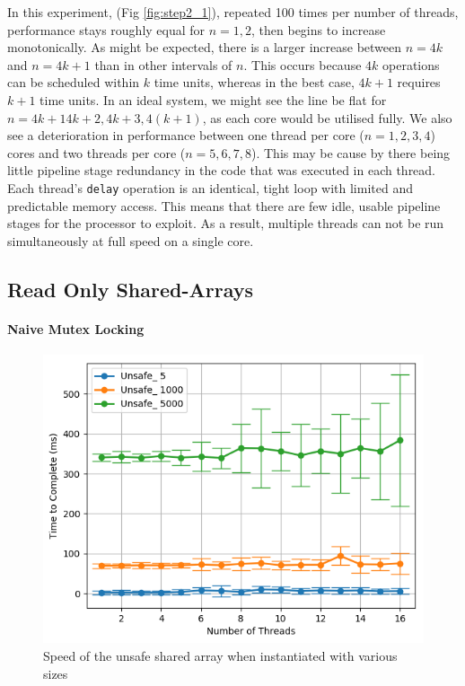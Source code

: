 \documentclass[11pt]{article}
\begin{document}
In this experiment, (Fig \ref{fig:step2_1}), repeated 100 times per number of threads, performance stays roughly equal for $n = 1, 2$, then begins to increase monotonically. As might be expected, there is a larger increase between $n= 4k$ and $n= 4k +1$ than in other intervals of $n$. This occurs because $4k$ operations can be scheduled within $k$ time units, whereas in the best case, $4k+1$ requires $k+1$ time units. In an ideal system, we might see the line be flat for $n = 4k+1 4k+2, 4k+3, 4(k+1)$, as each core would be utilised fully. We also see a deterioration in performance between one thread per core ($n = 1, 2, 3, 4$) cores and two threads per core ($n = 5, 6, 7, 8$). This may be cause by there being little pipeline stage redundancy in the code that was executed in each thread. Each thread's \texttt{delay} operation is an identical, tight loop with limited and predictable memory access. This means that there are few idle, usable pipeline stages for the processor to exploit. As a result, multiple threads can not be run simultaneously at full speed on a single core.


\subsection{Read Only Shared-Arrays}
\paragraph{Naive Mutex Locking}

\begin{figure}
\centering
\includegraphics[scale=0.65]{step3_1.png}
\caption{Speed of the unsafe shared array when instantiated with various sizes}
\label{fig:step3_1}
\end{figure}
\end{document}
